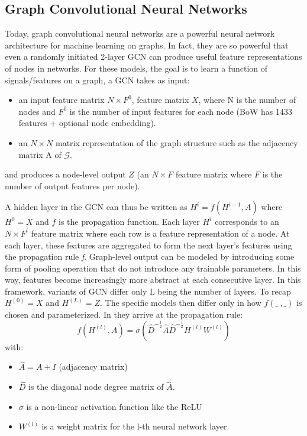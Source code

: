 \documentclass{report}
\begin{document}
\subsection{Graph Convolutional Neural Networks}
Today, graph convolutional neural networks are a powerful neural network architecture for machine learning on graphs. In fact, they are so powerful that even a randomly initiated 2-layer GCN can produce useful feature representations of nodes in networks. For these models, the goal is to learn a function of signals/features on a graph, a GCN takes as input:
\begin{itemize}
\item an input feature matrix $N \times F^0$, feature matrix $X$, where N is the number of nodes and $F^0$ is the number of input features for each node (BoW has 1433 features + optional node embedding).
\item an $N \times N$ matrix representation of the graph structure such as the adjacency matrix A of $\mathcal{G}$.
\end{itemize}
and produces a node-level output $Z$ (an $N \times F$ feature matrix where $F$ is the number of output features per node). 

A hidden layer in the GCN can thus be written as $H^i = f(H^{i-1},A)$ where $H^0 = X$ and $f$ is the propagation function. Each layer $H^i$ corresponds to an $N \times F^i$ feature matrix where each row is a feature representation of a node. At each layer, these features are aggregated to form the next layer’s features using the propagation rule \textit{f}. Graph-level output can be modeled by introducing some form of pooling operation that do not introduce any trainable parameters.
In this way, features become increasingly more abstract at each consecutive layer. In this framework, variants of GCN differ only  L being the number of layers. 
To recap $H^{(0)} = X$ and $H^{(L)}= Z $. The specific models then differ only in how $f(\_ \ , \_)$ is chosen and parameterized.
In \cite{Kipf_GCN} they arrive at the propagation rule:
\[
f(H^{(l)}, A) = \sigma (\hat{D}^{-\tfrac{1}{2}} \hat{A} \hat{D}^{-\tfrac{1}{2}} H^{(l)}W^{(l)}) 
\]
with: 
\begin{itemize}
\item $\hat{A}= A +I$ (adjacency matrix)
\item $\hat{D}$ is the diagonal node degree matrix of $\hat{A}$.
\item $\sigma$ is a non-linear activation function like the ReLU
\item $W^{(l)}$ is a weight matrix for the l-th neural network layer.
\end{itemize}
\end{document}
